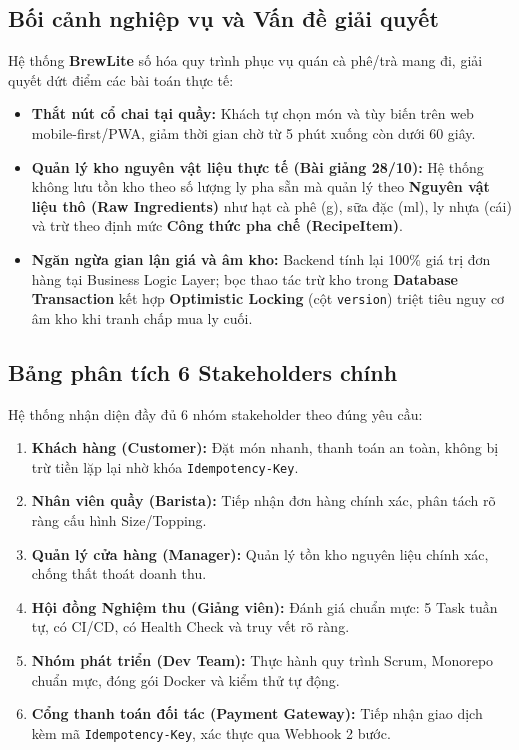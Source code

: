 \documentclass[12pt,a4paper]{article}
\begin{document}
\subsection{Bối cảnh nghiệp vụ và Vấn đề giải quyết}
Hệ thống \textbf{BrewLite} số hóa quy trình phục vụ quán cà phê/trà mang đi, giải quyết dứt điểm các bài toán thực tế:
\begin{itemize}[noitemsep]
    \item \textbf{Thắt nút cổ chai tại quầy:} Khách tự chọn món và tùy biến trên web mobile-first/PWA, giảm thời gian chờ từ 5 phút xuống còn dưới 60 giây.
    \item \textbf{Quản lý kho nguyên vật liệu thực tế (Bài giảng 28/10):} Hệ thống không lưu tồn kho theo số lượng ly pha sẵn mà quản lý theo \textbf{Nguyên vật liệu thô (Raw Ingredients)} như hạt cà phê (g), sữa đặc (ml), ly nhựa (cái) và trừ theo định mức \textbf{Công thức pha chế (RecipeItem)}.
    \item \textbf{Ngăn ngừa gian lận giá và âm kho:} Backend tính lại 100\% giá trị đơn hàng tại Business Logic Layer; bọc thao tác trừ kho trong \textbf{Database Transaction} kết hợp \textbf{Optimistic Locking} (cột \texttt{version}) triệt tiêu nguy cơ âm kho khi tranh chấp mua ly cuối.
\end{itemize}

\subsection{Bảng phân tích 6 Stakeholders chính}
Hệ thống nhận diện đầy đủ 6 nhóm stakeholder theo đúng yêu cầu:
\begin{enumerate}[noitemsep]
    \item \textbf{Khách hàng (Customer):} Đặt món nhanh, thanh toán an toàn, không bị trừ tiền lặp lại nhờ khóa \texttt{Idempotency-Key}.
    \item \textbf{Nhân viên quầy (Barista):} Tiếp nhận đơn hàng chính xác, phân tách rõ ràng cấu hình Size/Topping.
    \item \textbf{Quản lý cửa hàng (Manager):} Quản lý tồn kho nguyên liệu chính xác, chống thất thoát doanh thu.
    \item \textbf{Hội đồng Nghiệm thu (Giảng viên):} Đánh giá chuẩn mực: 5 Task tuần tự, có CI/CD, có Health Check và truy vết rõ ràng.
    \item \textbf{Nhóm phát triển (Dev Team):} Thực hành quy trình Scrum, Monorepo chuẩn mực, đóng gói Docker và kiểm thử tự động.
    \item \textbf{Cổng thanh toán đối tác (Payment Gateway):} Tiếp nhận giao dịch kèm mã \texttt{Idempotency-Key}, xác thực qua Webhook 2 bước.
\end{enumerate}
\end{document}
